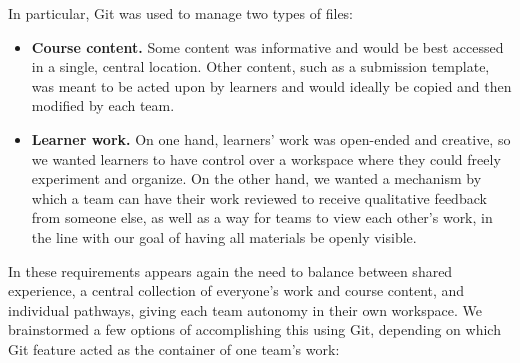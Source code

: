 \documentclass[12pt,twoside]{mitthesis}
\begin{document}
In particular, Git was used to manage two types of files:
\begin{itemize}
 	\item \textbf{Course content.} Some content was informative and would be best accessed in a single, central location. Other content, such as a submission template, was meant to be acted upon by learners and would ideally be copied and then modified by each team.
 	\item \textbf{Learner work.} On one hand, learners' work was open-ended and creative, so we wanted learners to have control over a workspace where they could freely experiment and organize. On the other hand, we wanted a mechanism by which a team can have their work reviewed to receive qualitative feedback from someone else, as well as a way for teams to view each other's work, in the line with our goal of having all materials be openly visible.
\end{itemize} 
In these requirements appears again the need to balance between shared experience, a central collection of everyone's work and course content, and individual pathways, giving each team autonomy in their own workspace. We brainstormed a few options of accomplishing this using Git, depending on which Git feature acted as the container of one team's work:
\end{document}
